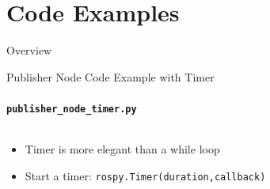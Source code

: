 \documentclass[aspectratio=43]{beamer}
\newcommand{\pyinline}[1]{\texttt{#1}}
\newcommand{\inline}[1]{\texttt{#1}}
\begin{document}
\section{Code Examples}
\begin{frame}[label=overview]{Overview}
	\tableofcontents[sectionstyle=show/shaded,subsectionstyle=show/shaded/shaded]
\end{frame}



\begin{frame}{Publisher Node Code Example with Timer}
	\framesubtitle{\texttt{publisher\_node\_timer.py}}
	\inputminted{python}{snippet/publisher_node_timer.py}
	\begin{itemize}
	\item Timer is more elegant than a while loop
	\item Start a timer: \pyinline{rospy.Timer(duration,callback)}
	\end{itemize}
\end{frame}
\end{document}
